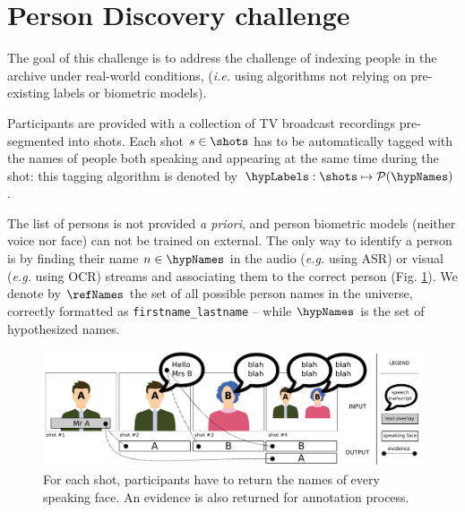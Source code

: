 \section{Person Discovery challenge}
\label{sec:challenge}


The goal of this challenge is to address the challenge of indexing people in the archive under real-world conditions,  (\emph{i.e.} using algorithms not relying on pre-existing labels or biometric models).

 Participants are provided with a collection of TV broadcast recordings pre-segmented into shots.
Each shot $s \in \shots$ has to be automatically tagged with the names of people both speaking and appearing at the same time during the shot: this tagging algorithm is denoted by $\hypLabels : \shots \mapsto \mathcal{P}(\hypNames)$.

The list of persons is not provided \emph{a priori}, and person biometric models (neither voice nor face) can not be trained on external. The only way to identify a person is by finding their name $n \in \hypNames$ in the audio (\emph{e.g.} using ASR) or visual (\emph{e.g.} using OCR) streams and associating them to the correct person (Fig. \ref{fig:evidence}). %
We denote by $\refNames$ the set of all possible person names in the universe, correctly formatted as \texttt{firstname\_lastname} -- while $\hypNames$ is the set of hypothesized names.

\begin{figure}[tb]
 \centering
 \includegraphics[width=1.\linewidth]{evidence.pdf}
\vspace*{-5mm}
 \caption{For each shot, participants have to return the names of every speaking face. An evidence is also returned for annotation process.}
\vspace*{-3mm}
 \label{fig:evidence}
\end{figure}

